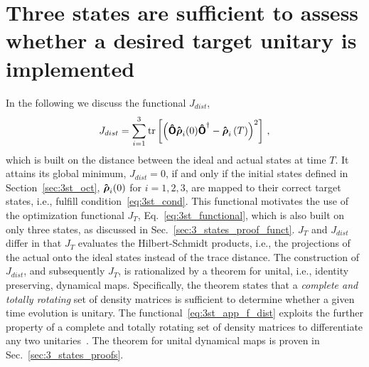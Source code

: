 \chapter{Three states are sufficient to assess
  whether a desired target unitary is implemented}
\label{app:3states_proof}

In the following we discuss the functional $J_{dist}$,
\begin{equation}
  J_{dist} = \sum_{i=1}^{3}
   \operatorname{tr}\left[\left(\boldsymbol{\mathsf{\hat{O}}}\boldsymbol{\mathsf{\hat{\rho}}}_{i}(0)\boldsymbol{\mathsf{\hat{O}}}^{\dagger}-\boldsymbol{\mathsf{\hat{\rho}}}_{i}\left(T\right)\right)^2\right]\,, 
  \label{eq:3st_app_f_dist}
\end{equation}
which is built on the distance between the ideal and actual
states at time $T$. It attains its global minimum, $J_{dist}=0$,
if and only if the initial states defined in Section~\ref{sec:3st_oct},
$\boldsymbol{\mathsf{\hat{\rho}}}_i(0)$ for $i=1,2,3$, are mapped to their correct target
states, i.e., fulfill condition~\eqref{eq:3st_cond}.
This functional motivates the use of the optimization functional
$J_T$, Eq.~\eqref{eq:3st_functional},
which is also built on only three states, as discussed in
Sec.~\ref{sec:3_states_proof_funct}. $J_T$ and $J_{dist}$ differ in that
$J_T$ evaluates the Hilbert-Schmidt
products, i.e., the projections of the actual onto the ideal states
instead of the trace distance.
The construction of $J_{dist}$, and subsequently $J_T$,
is rationalized by a theorem for unital, i.e., identity preserving, dynamical
maps. Specifically, the theorem states that a \emph{complete and totally
rotating} set of density matrices is sufficient to determine whether 
a given time evolution is unitary. The
functional~\eqref{eq:3st_app_f_dist} exploits
the further property of a complete and totally rotating set
of density matrices to differentiate any two
unitaries~\cite{ReichKochPRA13}. The theorem for unital dynamical maps
is proven in Sec.~\ref{sec:3_states_proofs}. 

